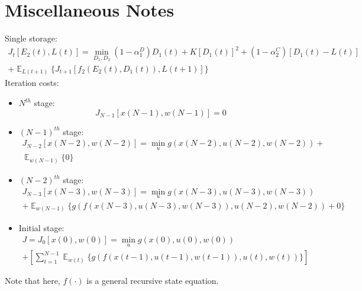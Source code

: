 \documentclass{article}
\DeclareMathOperator{\E}{\mathbb{E}}
\begin{document}
	\section{Miscellaneous Notes}
	Single storage:
	\begin{multline}
	J_{t}[E_{2}(t),L(t)] = \min_{D_{1},D_{2}}
	(1-\alpha_{1}^{D})D_{1}(t) 
	+ K[D_{1}(t)]^{2}
	+(1-\alpha_{2}^{C})[D_{1}(t)-L(t)]\\
	+\mathop{\E}_{L(t+1)} \{J_{t+1}[f_{2}(E_{2}(t),D_{1}(t)),L(t+1)]\}
	\end{multline}
	Iteration costs:
	\begin{itemize}
		\item $N^{th}$ stage: \\
		\begin{equation}
		J_{N-1}[x(N-1),w(N-1)]=0
		\end{equation}
		
		\item $(N-1)^{th}$ stage: \\
		\begin{multline}
		J_{N-2}[x(N-2),w(N-2)]=\min_{u} g(x(N-2),u(N-2),w(N-2))+\\ \mathop{\E}_{w(N-1)}\{0\}
		\end{multline}
		
		\item $(N-2)^{th}$ stage: \\
		\begin{multline}
		J_{N-3}[x(N-3),w(N-3)]=\min_{u} g(x(N-3),u(N-3),w(N-3))\\
		+ \mathop{\E}_{w(N-1)} \{
		g( f(x(N-3),u(N-3),w(N-3)) ,u(N-2),w(N-2)) + 0\}
		\end{multline}
		
		\item Initial stage: \\	
		\begin{multline}
		J=J_{0}[x(0),w(0)]=\min_{u} g(x(0),u(0),w(0))\\
		+\left[\sum_{t=1}^{N-1}\mathop{\E}_{w(t)} \{
		g( f(x(t-1),u(t-1),w(t-1)) ,u(t),w(t))
		\}\right]
		\end{multline}
	\end{itemize}
	
	Note that here, $f(\cdot)$ is a general recursive state equation.
	
	
	
	\printbibliography
\end{document}
